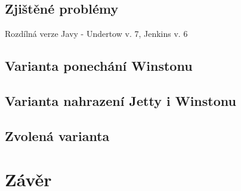     \subsection{Zjištěné problémy}
        Rozdílná verze Javy - Undertow v. 7, Jenkins v. 6\\
        
        
    \subsection{Varianta ponechání Winstonu}

    \subsection{Varianta nahrazení Jetty i Winstonu}

    \subsection{Zvolená varianta}



\section{Závěr}



